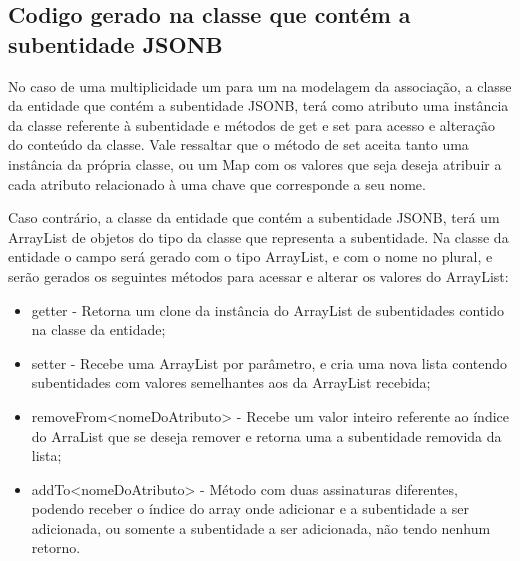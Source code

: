 \subsection{Codigo gerado na classe que contém a subentidade JSONB}
No caso de uma multiplicidade um para um na modelagem da associação, a classe da
entidade que contém a subentidade JSONB, terá como atributo uma instância da
classe referente à subentidade e métodos de get e set para acesso e alteração do
conteúdo da classe. Vale ressaltar que o método de set aceita tanto uma
instância da própria classe, ou um Map com os valores que seja deseja atribuir a
cada atributo relacionado à uma chave que corresponde a seu nome.

Caso contrário, a classe da entidade que contém a subentidade JSONB, terá um
ArrayList de objetos do tipo da classe que representa a subentidade. Na classe
da entidade o campo será gerado com o tipo ArrayList, e com o nome no plural, e
serão gerados os seguintes métodos para acessar e alterar os valores do
ArrayList:

\begin{itemize}
  \item getter - Retorna um clone da instância do ArrayList de subentidades
  contido na classe da entidade;
  \item setter - Recebe uma ArrayList por parâmetro, e cria uma nova lista
  contendo subentidades com valores semelhantes aos da ArrayList recebida;
  \item removeFrom<nomeDoAtributo> - Recebe um valor inteiro referente ao índice
  do ArraList que se deseja remover e retorna uma a subentidade removida da
  lista;
  \item addTo<nomeDoAtributo> - Método com duas assinaturas diferentes, podendo
  receber o índice do array onde adicionar e a subentidade a ser adicionada, ou
  somente a subentidade a ser adicionada, não tendo nenhum retorno.
\end{itemize}
